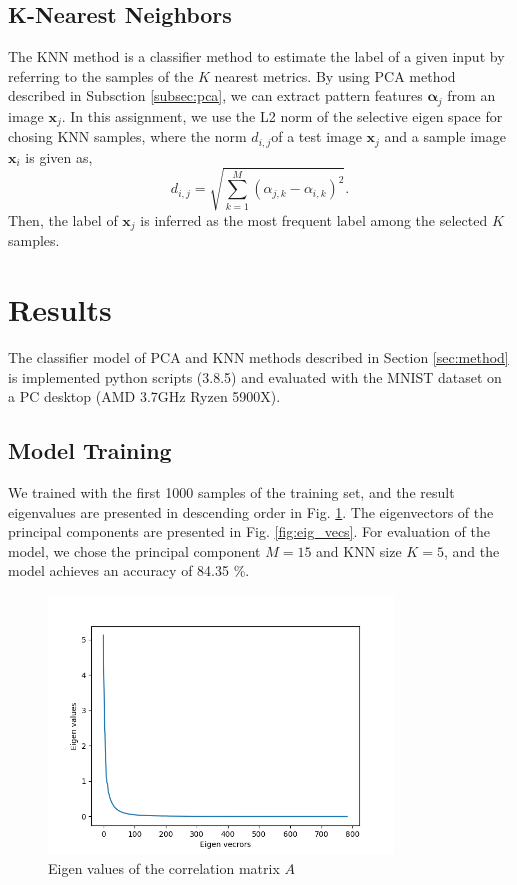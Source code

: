 \documentclass[conference]{IEEEtran}
\begin{document}
\subsection{K-Nearest Neighbors}
The KNN method is a classifier method to estimate the label of a given input by referring to the samples of the $K$ nearest metrics. 
By using PCA method described in Subsction \ref{subsec:pca}, we can extract pattern features $\boldsymbol\alpha_j$ from an image $\boldsymbol{x}_j$.
In this assignment, we use the L2 norm of the selective eigen space for chosing KNN samples, where the norm $d_{i,j}$of a test image $\boldsymbol{x}_j$ and a sample image $ \boldsymbol{x}_i$ is given as,
\begin{equation}
d_{i,j} = \sqrt{\sum_{k=1}^{M} (\alpha_{j,k} - \alpha_{i,k})^2}.
\end{equation}
Then, the label of $\boldsymbol{x}_j$ is inferred as the most frequent label among the selected $K$ samples.

\section{Results} %

The classifier model of PCA and KNN methods described in Section \ref{sec:method} is implemented python scripts (3.8.5) and evaluated with the MNIST dataset on a PC desktop (AMD 3.7GHz Ryzen 5900X).

\subsection{Model Training}
We trained with the first 1000 samples of the training set, and the result eigenvalues are presented in descending order in Fig. \ref{fig:eig_vals}.
The eigenvectors of the principal components are presented in Fig. \ref{fig:eig_vecs}.
For evaluation of the model, we chose the principal component $M=15$ and KNN size $K=5$, and the model achieves an accuracy of 84.35 \%.

\begin{figure}[!t]
	\centering
	\includegraphics[width=3.6in]{eigen_values.png}	
	\caption{Eigen values of the correlation matrix $A$}
	\label{fig:eig_vals}
\end{figure}
\end{document}
